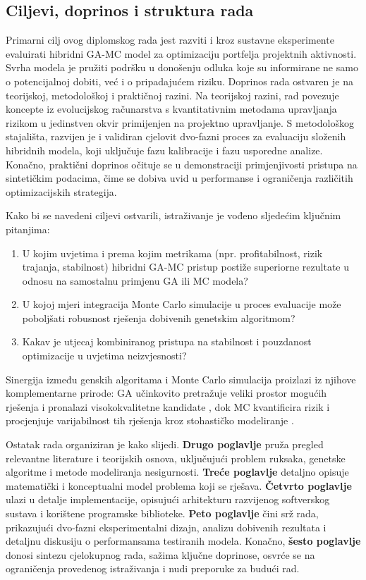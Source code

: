 \subsection{Ciljevi, doprinos i struktura rada}

Primarni cilj ovog diplomskog rada jest razviti i kroz sustavne eksperimente evaluirati hibridni GA-MC model za optimizaciju portfelja projektnih aktivnosti. Svrha modela je pružiti podršku u donošenju odluka koje su informirane ne samo o potencijalnoj dobiti, već i o pripadajućem riziku. Doprinos rada ostvaren je na teorijskoj, metodološkoj i praktičnoj razini. Na teorijskoj razini, rad povezuje koncepte iz evolucijskog računarstva s kvantitativnim metodama upravljanja rizikom u jedinstven okvir primijenjen na projektno upravljanje. S metodološkog stajališta, razvijen je i validiran cjelovit dvo-fazni proces za evaluaciju složenih hibridnih modela, koji uključuje fazu kalibracije i fazu usporedne analize. Konačno, praktični doprinos očituje se u demonstraciji primjenjivosti pristupa na sintetičkim podacima, čime se dobiva uvid u performanse i ograničenja različitih optimizacijskih strategija.

Kako bi se navedeni ciljevi ostvarili, istraživanje je vođeno sljedećim ključnim pitanjima:
\begin{enumerate}
\item U kojim uvjetima i prema kojim metrikama (npr. profitabilnost, rizik trajanja, stabilnost) hibridni GA-MC pristup postiže superiorne rezultate u odnosu na samostalnu primjenu GA ili MC modela?
\item U kojoj mjeri integracija Monte Carlo simulacije u proces evaluacije može poboljšati robusnost rješenja dobivenih genetskim algoritmom?
\item Kakav je utjecaj kombiniranog pristupa na stabilnost i pouzdanost optimizacije u uvjetima neizvjesnosti?
\end{enumerate}

Sinergija između genskih algoritama i Monte Carlo simulacija proizlazi iz njihove komplementarne prirode: GA učinkovito pretražuje veliki prostor mogućih rješenja i pronalazi visokokvalitetne kandidate \cite{Goldberg1989}, dok MC kvantificira rizik i procjenjuje varijabilnost tih rješenja kroz stohastičko modeliranje \cite{Rubinstein2016}.

Ostatak rada organiziran je kako slijedi. \textbf{Drugo poglavlje} pruža pregled relevantne literature i teorijskih osnova, uključujući problem ruksaka, genetske algoritme i metode modeliranja nesigurnosti. \textbf{Treće poglavlje} detaljno opisuje matematički i konceptualni model problema koji se rješava. \textbf{Četvrto poglavlje} ulazi u detalje implementacije, opisujući arhitekturu razvijenog softverskog sustava i korištene programske biblioteke. \textbf{Peto poglavlje} čini srž rada, prikazujući dvo-fazni eksperimentalni dizajn, analizu dobivenih rezultata i detaljnu diskusiju o performansama testiranih modela. Konačno, \textbf{šesto poglavlje} donosi sintezu cjelokupnog rada, sažima ključne doprinose, osvrće se na ograničenja provedenog istraživanja i nudi preporuke za budući rad.

